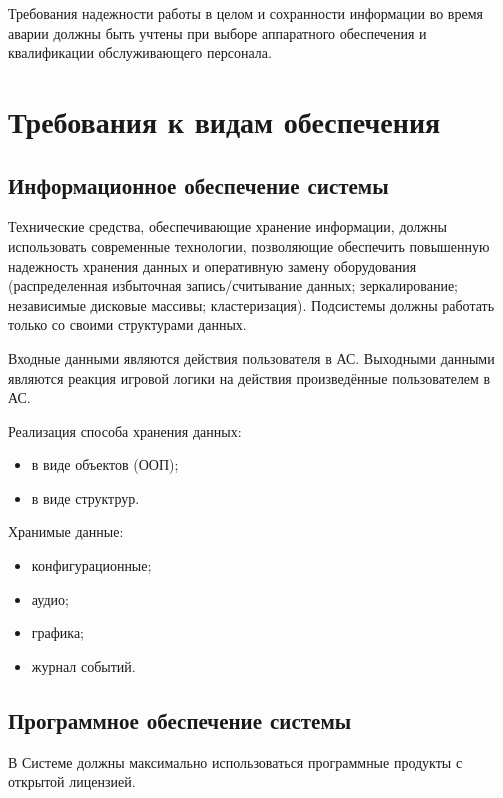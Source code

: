 Требования надежности работы в целом и сохранности информации во время аварии должны быть 
учтены при выборе аппаратного обеспечения и квалификации обслуживающего персонала.

\section{Требования к видам обеспечения}
\subsection{Информационное обеспечение системы}
Технические средства, обеспечивающие хранение информации, должны использовать современные 
технологии, позволяющие обеспечить повышенную надежность хранения данных и оперативную замену 
оборудования (распределенная избыточная запись/считывание данных; зеркалирование; независимые 
дисковые массивы; кластеризация). Подсистемы должны работать только со своими структурами данных.

Входные данными являются действия пользователя в АС. Выходными данными являются реакция игровой логики 
на действия произведённые пользователем в АС.

Реализация способа хранения данных:
\begin{itemize}
    \item в виде объектов (ООП);
    \item в виде структрур.
\end{itemize}

Хранимые данные:
\begin{itemize}
    \item конфигурационные;
    \item аудио;
    \item графика;
    \item журнал событий.
\end{itemize}

\subsection{Программное обеспечение системы}
В Системе должны максимально использоваться программные продукты с открытой лицензией. 


